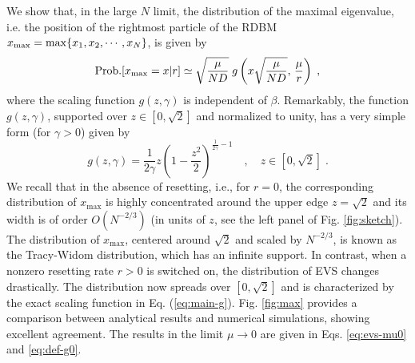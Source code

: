 \documentclass[onecolumn,superscriptaddress,
 amsmath,amssymb,
 aps,
 prd,
]{revtex4-1}
\begin{document}
{\vspace{0.3cm}
 We show that, in the large $N$ limit, the distribution of the maximal eigenvalue, i.e. the position of the rightmost particle of the RDBM $x_{\rm max} = \max\{x_1, x_2, \cdots, x_N\}$, is given by
\begin{equation} \label{eq:main-max}
{\rm Prob.}[x_{\rm max} = x | r] \simeq \sqrt{\frac{\mu}{N D}} \; g\left( x \sqrt{\frac{\mu}{N D}}, \, \frac{\mu}{r} \right) \;,
\end{equation}
where the scaling function $g(z, \gamma)$ is independent of $\beta$. Remarkably, the function $g(z, \gamma)$, supported over $z \in [0, \sqrt{2}]$ and normalized to unity, has a very simple form (for $\gamma > 0$) given by
\begin{equation} \label{eq:main-g}
g(z, \gamma) = \frac{1}{2\gamma} z \left(1 - \frac{z^2}{2}\right)^{\frac{1}{2\gamma} - 1} \quad, \quad z \in [0,\sqrt{2}] \;.
\end{equation}
We recall that in the absence of resetting, i.e., for $r=0$, the corresponding distribution of $x_{\max}$ is highly concentrated around the upper edge $z = \sqrt{2}$ and its width is of order $O(N^{-2/3})$ (in units of $z$, see the left panel of Fig. \ref{fig:sketch}). The distribution of $x_{\max}$, centered around $\sqrt{2}$ and scaled by $N^{-2/3}$, is known as the Tracy-Widom distribution, which has an infinite support. In contrast, when a nonzero resetting rate $r>0$ is switched on, the distribution of EVS changes drastically. The distribution now spreads over $[0,\sqrt{2}]$ and is characterized by the exact scaling function in Eq. (\ref{eq:main-g}). Fig. \ref{fig:max} provides a comparison between analytical results and numerical simulations, showing excellent agreement.  The results in the limit $\mu \to 0$ are given in Eqs. 
\eqref{eq:evs-mu0} and \eqref{eq:def-g0}.




}
\end{document}
